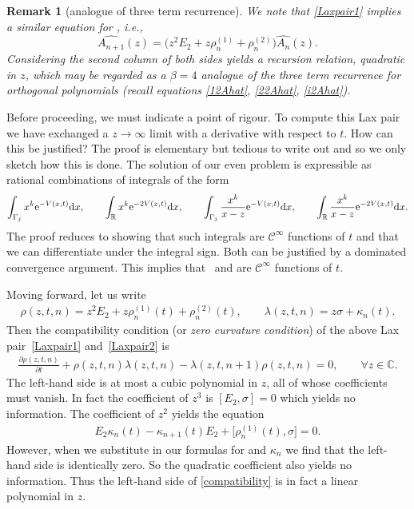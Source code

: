 \documentclass[pdftex]{sigma}
\numberwithin{equation}{section}
\newtheorem{Remark}[Theorem]{Remark}
\begin{document}
\begin{Remark}[analogue of three term recurrence]\label{recurrence} We note that \eqref{Laxpair1} implies a similar equation for , i.e.,
\begin{equation*}
\widehat{A_{n+1}}(z) = \big( z^2 E_2 + z \rho_n^{(1)} + \rho_n^{(2)} \big) \widehat{A_{n}}(z) .
\end{equation*}
Considering the second column of both sides yields a recursion relation, quadratic in $z$, which may be regarded as a $\beta = 4$ analogue of the three term recurrence for orthogonal polynomials (recall equations \eqref{12Ahat}, \eqref{22Ahat}, \eqref{i2Ahat}).
\end{Remark}

Before proceeding, we must indicate a point of rigour. To compute this Lax pair we have exchanged a $z \to \infty$ limit with a derivative with respect to $t$. How can this be justified? The proof is elementary but tedious to write out and so we only sketch how this is done. The solution of our even problem  is expressible as rational combinations of integrals of the form
\[
\int_{\Gamma_j} x^k {\rm e}^{-V(x,t)} {\rm d}x, \qquad \int_{\mathbb{R}} x^k {\rm e}^{-2V(x,t)} {\rm d}x, \qquad \int_{\Gamma_j} \frac{x^k}{x-z} {\rm e}^{-V(x,t)} {\rm d}x, \qquad \int_{\mathbb{R}} \frac{x^k}{x-z} {\rm e}^{-2V(x,t)} {\rm d}x.
\]
 The proof reduces to showing that such integrals are $\mathscr{C}^\infty$ functions of $t$ and that we can differentiate under the integral sign. Both can be justified by a dominated convergence argument. This implies that~ and  are $\mathscr{C}^\infty$ functions of $t$.

Moving forward, let us write
\begin{align*}
\rho(z,t,n) = z^2 E_2 + z \rho_n^{(1)}(t) + \rho_n^{(2)}(t),\qquad
\lambda(z,t,n) = z \sigma + \kappa_n(t) .
\end{align*}
Then the compatibility condition (or \textit{zero curvature condition}) of the above Lax pair~\eqref{Laxpair1} and~\eqref{Laxpair2} is
\begin{align}\label{compatibility}
\frac{\partial \rho(z,t,n)}{\partial t} + \rho(z,t,n) \lambda(z,t,n)-\lambda(z,t,n+1) \rho(z,t,n)=0, \qquad \forall z \in \mathbb{C} .
\end{align}
The left-hand side is at most a cubic polynomial in $z$, all of whose coefficients must vanish. In fact the coefficient of $z^3$ is $[E_2, \sigma] = 0$ which yields no information. The coefficient of $z^2$ yields the equation
\begin{align*}
E_2 \kappa_n(t) - \kappa_{n+1}(t) E_2 + \big[ \rho_n^{(1)}(t),\sigma\big] = 0.
\end{align*}
However, when we substitute in our formulas for  and $\kappa_n$ we find that the left-hand side is identically zero. So the quadratic coefficient also yields no information. Thus the left-hand side of \eqref{compatibility} is in fact a linear polynomial in $z$.
\end{document}
